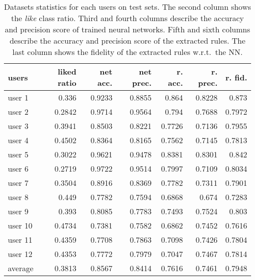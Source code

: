 \begin{table}%
    \centering
    \caption{
        Datasets statistics for each users on test sets.
        The second column shows the \emph{like} class ratio.
        Third and fourth columns describe the accuracy and precision score of trained neural networks.
        Fifth and sixth columns describe the accuracy and precision score of the extracted rules.
        The last column shows the fidelity of the extracted rules w.r.t.\ the NN.
    }
        \begin{tabular}{l||r|r|r|r|r|r}
            \textbf{users} & \textbf{liked ratio} & \textbf{net acc.} & \textbf{net prec.} & \textbf{r. acc.} & \textbf{r. prec.} & \textbf{r. fid.}\\
            \hline\hline
            user 1 & 0.336 & 0.9233 & 0.8855 & 0.864 & 0.8228 & 0.873\\
            user 2 & 0.2842 & 0.9714 & 0.9564 & 0.794 & 0.7688 & 0.7972\\
            user 3 & 0.3941 & 0.8503 & 0.8221 & 0.7726 & 0.7136 & 0.7955\\
            user 4 & 0.4502 & 0.8364 & 0.8165 & 0.7562 & 0.7145 & 0.7813\\
            user 5 & 0.3022 & 0.9621 & 0.9478 & 0.8381 & 0.8301 & 0.842\\
            user 6 & 0.2719 & 0.9722 & 0.9514 & 0.7997 & 0.7109 & 0.8034\\
            user 7 & 0.3504 & 0.8916 & 0.8369 & 0.7782 & 0.7311 & 0.7901\\
            user 8 & 0.449 & 0.7782 & 0.7594 & 0.6868 & 0.674 & 0.7283\\
            user 9 & 0.393 & 0.8085 & 0.7783 & 0.7493 & 0.7524 & 0.803\\
            user 10 & 0.4734 & 0.7381 & 0.7582 & 0.6862 & 0.7452 & 0.7616\\
            user 11 & 0.4359 & 0.7708 & 0.7863 & 0.7098 & 0.7426 & 0.7804\\
            user 12 & 0.4353 & 0.7772 & 0.7979 & 0.7047 & 0.7467 & 0.7814\\
            \hline\hline
            average & 0.3813 & 0.8567 & 0.8414 & 0.7616 & 0.7461 & 0.7948\\
        \end{tabular}
\label{tab:net-rules-stats}
\end{table}